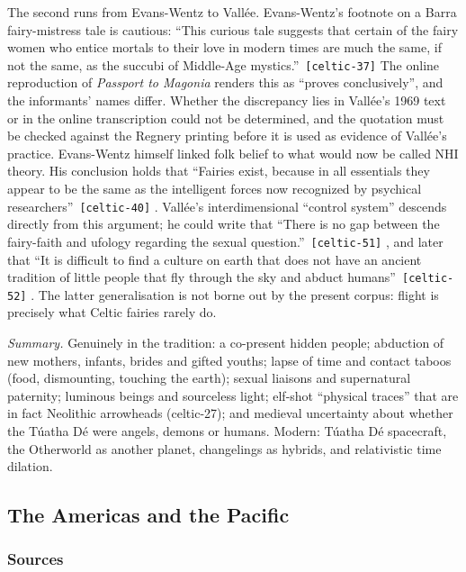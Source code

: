 \documentclass[11pt,a4paper]{article}
\newcommand{\pid}[1]{\texttt{\small #1}}
\begin{document}
The second runs from Evans-Wentz to Vallée. Evans-Wentz's footnote on a Barra fairy-mistress tale is cautious: \enquote{This curious tale suggests that certain of the fairy women who entice mortals to their love in modern times are much the same, if not the same, as the succubi of Middle-Age mystics.}~\pid{[celtic-37]} The online reproduction of \emph{Passport to Magonia} renders this as ``proves conclusively'', and the informants' names differ. Whether the discrepancy lies in Vallée's 1969 text or in the online transcription could not be determined, and the quotation must be checked against the Regnery printing before it is used as evidence of Vallée's practice. Evans-Wentz himself linked folk belief to what would now be called NHI theory. His conclusion holds that \enquote{Fairies exist, because in all essentials they appear to be the same as the intelligent forces now recognized by psychical researchers}~\pid{[celtic-40]} \parencite{evanswentz1911}. Vallée's interdimensional ``control system'' descends directly from this argument; he could write that \enquote{There is no gap between the fairy-faith and ufology regarding the sexual question.}~\pid{[celtic-51]} \parencite{vallee1969}, and later that \enquote{It is difficult to find a culture on earth that does not have an ancient tradition of little people that fly through the sky and abduct humans}~\pid{[celtic-52]} \parencite{vallee1990}. The latter generalisation is not borne out by the present corpus: flight is precisely what Celtic fairies rarely do.

\emph{Summary.} Genuinely in the tradition: a co-present hidden people; abduction of new mothers, infants, brides and gifted youths; lapse of time and contact taboos (food, dismounting, touching the earth); sexual liaisons and supernatural paternity; luminous beings and sourceless light; elf-shot ``physical traces'' that are in fact Neolithic arrowheads (celtic-27); and medieval uncertainty about whether the Túatha Dé were angels, demons or humans. Modern: Túatha Dé spacecraft, the Otherworld as another planet, changelings as hybrids, and relativistic time dilation.

\subsection{The Americas and the Pacific}\label{sec:americas}

\subsubsection{Sources}
\end{document}
